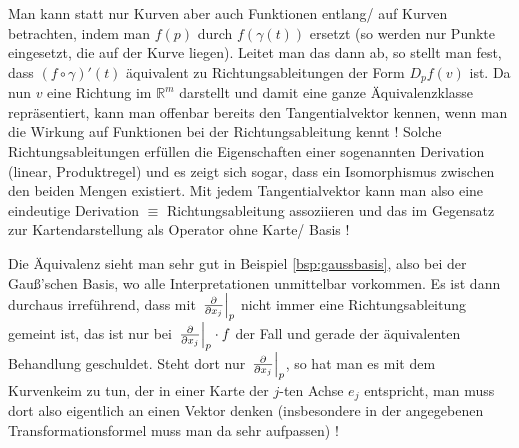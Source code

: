 \documentclass[../H_Analysis_main.tex]{subfiles}
\begin{document}
Man kann statt nur Kurven aber auch Funktionen entlang/ auf Kurven betrachten, indem man $f(p)$ durch $f(\gamma(t))$ ersetzt (so werden nur Punkte eingesetzt, die auf der Kurve liegen). Leitet man das dann ab, so stellt man fest, dass $(f \circ \gamma)'(t)$ äquivalent zu Richtungsableitungen der Form $D_p f(v)$ ist. Da nun $v$ eine Richtung im $\mathbb{R}^m$ darstellt und damit eine ganze Äquivalenzklasse repräsentiert, kann man offenbar bereits den Tangentialvektor kennen, wenn man die Wirkung auf Funktionen bei der Richtungsableitung kennt ! Solche Richtungsableitungen erfüllen die Eigenschaften einer sogenannten Derivation (linear, Produktregel) und es zeigt sich sogar, dass ein Isomorphismus zwischen den beiden Mengen existiert. Mit jedem Tangentialvektor kann man also eine eindeutige Derivation $\equiv$ Richtungsableitung assoziieren und das im Gegensatz zur Kartendarstellung als Operator ohne Karte/ Basis !



Die Äquivalenz sieht man sehr gut in Beispiel \ref{bsp:gaussbasis}, also bei der Gauß'schen Basis, wo alle Interpretationen unmittelbar vorkommen. Es ist dann durchaus irreführend, dass mit $\eval{\pdv{x_j}}_p$ nicht immer eine Richtungsableitung gemeint ist, das ist nur bei $\eval{\pdv{x_j}}_p \cdot f$ der Fall und gerade der äquivalenten Behandlung geschuldet. Steht dort nur $\eval{\pdv{x_j}}_p$, so hat man es mit dem Kurvenkeim zu tun, der in einer Karte der $j$-ten Achse $e_j$ entspricht, man muss dort also eigentlich an einen Vektor denken (insbesondere in der angegebenen Transformationsformel muss man da sehr aufpassen) !\\





\end{document}
